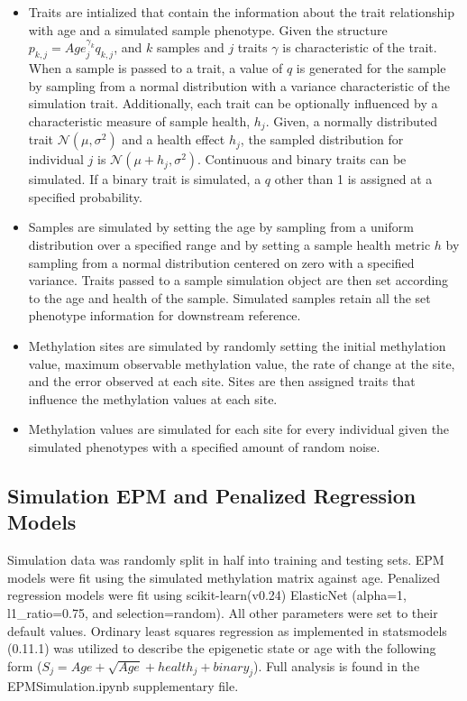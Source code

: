 \documentclass{article}
\begin{document}
{{\begin{linenumbers}
\begin{itemize}
    \item{Traits are intialized that contain the information about the trait relationship with age and a 
    simulated sample phenotype. Given the structure $p_{k,j} = Age_j^{\gamma_{k}} q_{k,j}$, and $k$ samples 
    and $j$ traits $\gamma$ is characteristic of the trait. When a sample is passed to a trait, a value of $q$ is
    generated for the sample by sampling from a normal distribution with a variance characteristic of the 
    simulation trait. Additionally, each trait can be optionally influenced by a characteristic measure of sample 
    health, $h_j$. Given, a normally distributed trait $\mathcal{N}(\mu,\sigma^{2})$ and a health effect $h_j$, 
    the sampled distribution for individual $j$ is $\mathcal{N}(\mu + h_j,\sigma^{2})$. Continuous and binary 
    traits can be simulated. If a binary trait is simulated, a $q$ other than 1 is assigned at a 
    specified probability.}
     
    \item{Samples are simulated by setting the age by sampling from a uniform distribution over a specified range 
    and by setting a sample health metric $h$ by sampling from a normal distribution centered on zero with a 
    specified variance. Traits passed to a sample simulation object are then set according to the age and 
    health of the sample. Simulated samples retain all the set phenotype information for downstream reference.}

    \item{Methylation sites are simulated by randomly setting the initial methylation value, maximum observable 
    methylation value, the rate of change at the site, and the error observed at each site. Sites are then assigned 
    traits that influence the methylation values at each site.}

    \item{Methylation values are simulated for each site for every individual given the simulated phenotypes with a 
    specified amount of random noise.}
\end{itemize}

\subsection{Simulation EPM and Penalized Regression Models}

Simulation data was randomly split in half into training and testing sets. EPM models were fit using the 
simulated methylation matrix against age. Penalized regression models were fit 
using scikit-learn(v0.24)\cite{Pedregosa2011-fi} ElasticNet (alpha=1, l1\_ratio=0.75, and selection=random). 
All other parameters were set to their default values. Ordinary least squares regression as implemented in 
statsmodels (0.11.1)\cite{Seabold2010-lt} was utilized to describe the epigenetic state or age with the following 
form ($S_j  = Age + \sqrt{Age} + health_j + binary_j$). Full analysis is found in the 
EPMSimulation.ipynb supplementary file.  


\end{linenumbers}}}
\end{document}
